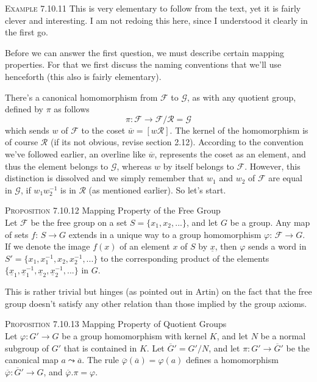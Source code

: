 \documentclass[12pt]{article}
\begin{document}
\textsc {Example 7.10.11} This is very elementary to follow from the text, yet it is fairly clever and interesting. I am not redoing this here, since I understood it clearly in the first go.
\par
Before we can answer the first question, we must describe certain mapping properties. For that we first discuss the naming conventions that we'll use henceforth (this also is fairly elementary).
\par
There's a canonical homomorphism from $\mathcal F$ to $\mathcal G$, as with any quotient group, defined by $\pi$ as follows
\begin{equation*}
\pi : \mathcal {F \rightarrow F/R = G}
\end{equation*}
which sends $w$ of $\mathcal F$ to the coset $\overline w = [w\mathcal R]$. The kernel of the homomorphism is of course $\mathcal R$ (if its not obvious, revise section 2.12). According to the convention we've followed earlier, an overline like $\overline w$, represents the coset as an element, and thus the element belongs to $\mathcal G$, whereas $w$ by itself belongs to $\mathcal F$. However, this distinction is dissolved and we simply remember that $w_{1}$ and $w_{2}$ of $\mathcal F$ are equal in $\mathcal G$, if $w_{1}w_{2}^{-1}$ is in $\mathcal R$ (as mentioned earlier). So let's start.
\par
\textsc {Proposition 7.10.12} Mapping Property of the Free Group\\
Let $\mathcal F$ be the free group on a set $S=\{x_{1},x_{2},...\}$, and let $G$ be a group. Any map of sets $f:\,S \rightarrow G$ extends in a unique way to a group homomorphism $\varphi : \, \mathcal F \rightarrow G$. If we denote the image $f(x)$ of an element $x$ of $S$ by $\underline x$, then $\varphi$ sends a word in $S'=\{x_{1},x_{1}^{-1},x_{2},x_{2}^{-1},...\}$ to the corresponding product of the elements $\{\underline x_{1}, \underline x_{1}^{-1}, \underline x_{2}, \underline x_{2}^{-1},...\}$ in $G$.
\par
This is rather trivial but hinges (as pointed out in Artin) on the fact that the free group doesn't satisfy any other relation than those implied by the group axioms.
\par
\textsc {Proposition 7.10.13} Mapping Property of Quotient Groups\\
Let $\varphi : G' \rightarrow G$ be a group homomorphism with kernel $K$, and let $N$ be a normal subgroup of $G'$ that is contained in $K$. Let $\overline G' = G'/N$, and let $\pi : G' \rightarrow \overline G'$ be the canonical map $a \leadsto \overline a$. The rule $\overline \varphi (\overline a) = \varphi (a)$ defines a homomorphism $\overline \varphi : \overline G' \rightarrow G$, and $\overline \varphi . \pi = \varphi$.
\end{document}
